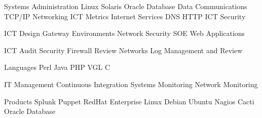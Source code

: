 \documentclass{resume} %
\begin{document}

\begin{rSection}{Systems Administration}
Linux
Solaris
Oracle Database
Data Communications
TCP/IP Networking
ICT Metrics
Internet Services
DNS
HTTP
ICT Security
\end{rSection}
\begin{rSection}{ICT Design}
Gateway Environments
Network
Security
SOE
Web Applications
\end{rSection}
\begin{rSection}{ICT Audit}
Security
Firewall Review
Networks
Log Management and Review
\end{rSection}
\begin{rSection}{Languages}
Perl
Java
PHP
VGL
C
\end{rSection}
\begin{rSection}{IT Management}
Continuous Integration
Systems Monitoring
Network Monitoring
\end{rSection}
\begin{rSection}{Products}
Splunk
Puppet
RedHat Enterprise Linux
Debian
Ubuntu
Nagios
Cacti
Oracle Database
\end{rSection}


\end{document}
